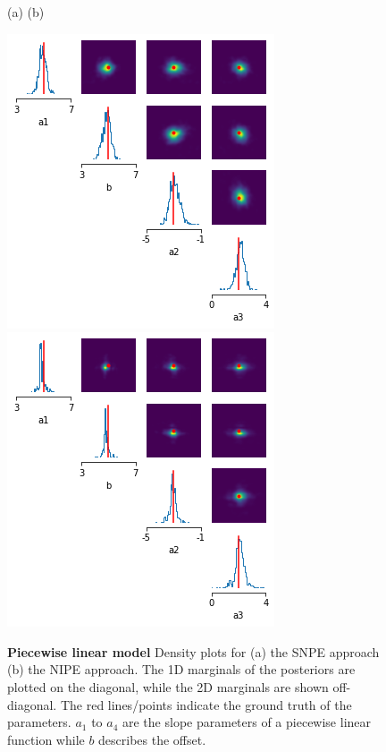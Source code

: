 \documentclass[12pt]{extreport}
\begin{document}
\begin{figure}[h]
    \begin{minipage}{10cm}
        \small (a)  \hspace{7cm}  (b)  
    \end{minipage}
    
     \centering

    \includegraphics[width=0.45\linewidth]{piecewise_density_plot_snpe_final.png}
    \includegraphics[width=0.45\linewidth]{piecewise_density_plot_incremental_final.png}



    
\caption{\label{piecewise2}\textbf{Piecewise linear model} \small Density plots for (a) the SNPE approach  (b) the NIPE approach. The 1D marginals of the posteriors are plotted on the diagonal, while the 2D marginals are shown off-diagonal. The red lines/points indicate the ground truth of the parameters. $a_1$ to $a_4$ are the slope parameters of a piecewise linear function while $b$ describes the offset.}
  

\end{figure}



\end{document}
